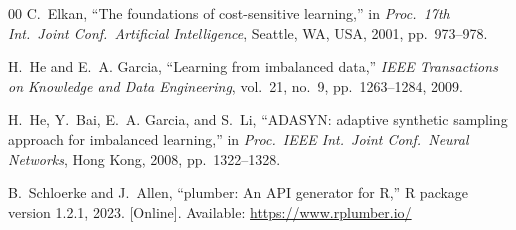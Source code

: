 \documentclass[10pt, conference, letterpaper]{IEEEtran}
\begin{document}
\begin{thebibliography}{00}
C.~Elkan, ``The foundations of cost-sensitive learning,'' in \textit{Proc.\ 17th Int.\ Joint Conf.\ Artificial Intelligence}, Seattle, WA, USA, 2001, pp.~973--978.

H.~He and E.~A. Garcia, ``Learning from imbalanced data,'' \textit{IEEE Transactions on Knowledge and Data Engineering}, vol.~21, no.~9, pp.~1263--1284, 2009.

H.~He, Y.~Bai, E.~A. Garcia, and S.~Li, ``ADASYN: adaptive synthetic sampling approach for imbalanced learning,'' in \textit{Proc.\ IEEE Int.\ Joint Conf.\ Neural Networks}, Hong Kong, 2008, pp.~1322--1328.

B.~Schloerke and J.~Allen, ``plumber: An API generator for R,'' R package version 1.2.1, 2023. [Online]. Available: \url{https://www.rplumber.io/}

\end{thebibliography}
\end{document}
